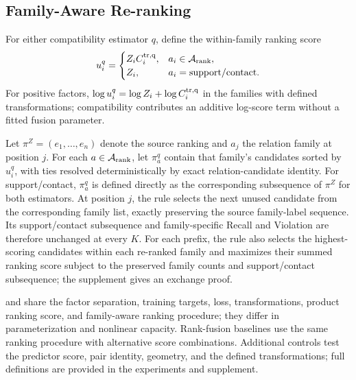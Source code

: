 \subsection{Family-Aware Re-ranking}

For either compatibility estimator $q$, define the within-family ranking score
\begin{equation}
u_i^q=\begin{cases}
Z_iC_i^{\rm tr,q}, & a_i\in\mathcal A_{\rm rank},\\
Z_i, & a_i=\mathrm{support/contact}.
\end{cases}
\end{equation}
For positive factors, $\log u_i^q=\log Z_i+\log C_i^{\rm tr,q}$ in the
families with defined transformations; compatibility contributes an additive
log-score term without a fitted fusion parameter.

Let $\pi^Z=(e_1,\ldots,e_n)$ denote the source ranking and $a_j$ the relation
family at position $j$. For each $a\in\mathcal A_{\rm rank}$, let $\pi_a^q$ contain
that family's candidates sorted by $u_i^q$, with ties resolved deterministically
by exact relation-candidate identity. For support/contact, $\pi_a^q$ is defined
directly as the corresponding subsequence of $\pi^Z$ for both estimators. At position $j$, the rule
selects the next unused candidate from the corresponding family list, exactly preserving the
source family-label sequence. Its support/contact subsequence and
family-specific Recall and Violation are therefore unchanged at every $K$. For
each prefix, the rule also selects the highest-scoring candidates within each
re-ranked family and maximizes their summed ranking score subject to the preserved
family counts and support/contact subsequence; the supplement gives an exchange
proof.

\methodlinear{} and \methodmlp{} share the factor separation, training targets,
loss, transformations, product ranking score, and family-aware ranking procedure; they
differ in parameterization and nonlinear capacity. Rank-fusion baselines use the
same ranking procedure with alternative score combinations. Additional controls test the predictor score, pair
identity, geometry, and the defined transformations; full definitions are
provided in the experiments and supplement.
